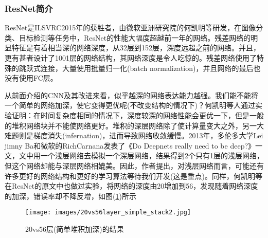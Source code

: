         \subsubsection{ResNet简介}
            \par
            ResNet\cite{2015.HeKaiming}是ILSVRC2015年的获胜者，由微软亚洲研究院的何凯明等研发，在图像分类、目标检测等任务中，ResNet的性能大幅度超越前一年的网络。残差网络的明显特征是有着相当深的网络深度，从32层到152层，深度远超之前的网络。并且，更有甚者设计了1001层的网络结构，其网络深度是令人吃惊的。残差网络使用了特殊的跳跃式连接，大量使用批量归一化(batch normalization)，并且网络的最后也没有使用FC层。
            \par
            从前面介绍的CNN及其改进来看，似乎越深的网络表达能力越强。我们能不能将一个简单的网络加深，使它变得更优呢(不改变结构的情况下)？何凯明等人通过实验证明：在时间复杂度相同的情况下，深度较深的网络性能会更优一下，但是一般的堆积网络块并不能使网络更好。堆积的深层网络除了使计算量变大之外，另一大难题则是梯度消失(infernation)，进而导致网络收敛缓慢。2013年，多伦多大学Lei jimny Ba和微软的RichCarnana发表了《Do Deepnets really need to be deep?》一文，文中用一个浅层网络去模拟一个深层网络，结果得到2个只有1层的浅层网络，但这个网络却能与深层网络相媲美。因此，作者提出，对浅层网络而言，可能还有许多更好的网络结构和更好的学习算法等待我们开发(这是重点)。同样，何凯明等在ResNet的原文\cite{2015.HeKaiming}中也做过实验，将网络的深度由20增加到56，发现随着网络深度的加深，错误率却不降反增，如图(\ref{fig:20vs56层(简单堆积加深)的结果图})所示
            \begin{figure}[H]
              \centering
                \texttt{[image: images/20vs56layer\_simple\_stack2.jpg]}
                \caption{20vs56层(简单堆积加深)的结果}
                \label{fig:20vs56层(简单堆积加深)的结果图}
            \end{figure}

